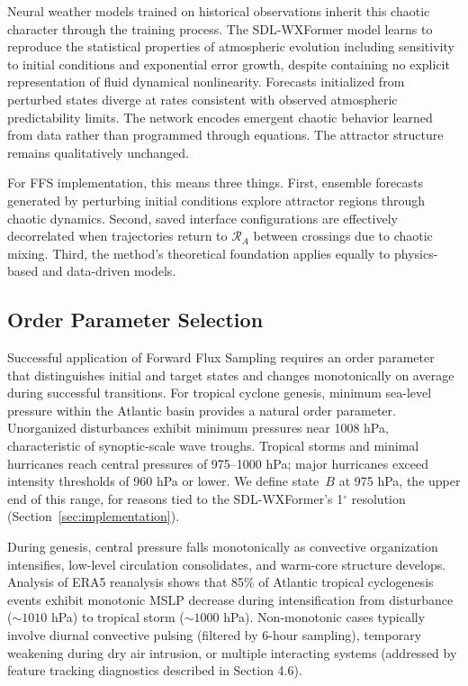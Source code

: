 \documentclass[11pt]{article}
\begin{document}
Neural weather models trained on historical observations inherit this chaotic character through the training process. The SDL-WXFormer model learns to reproduce the statistical properties of atmospheric evolution including sensitivity to initial conditions and exponential error growth, despite containing no explicit representation of fluid dynamical nonlinearity. Forecasts initialized from perturbed states diverge at rates consistent with observed atmospheric predictability limits. The network encodes emergent chaotic behavior learned from data rather than programmed through equations. The attractor structure remains qualitatively unchanged.

For FFS implementation, this means three things. First, ensemble forecasts generated by perturbing initial conditions explore attractor regions through chaotic dynamics. Second, saved interface configurations are effectively decorrelated when trajectories return to $\mathcal{R}_A$ between crossings due to chaotic mixing. Third, the method's theoretical foundation applies equally to physics-based and data-driven models.

\subsection{Order Parameter Selection}

Successful application of Forward Flux Sampling requires an order parameter that distinguishes initial and target states and changes monotonically on average during successful transitions. For tropical cyclone genesis, minimum sea-level pressure within the Atlantic basin provides a natural order parameter. Unorganized disturbances exhibit minimum pressures near 1008 hPa, characteristic of synoptic-scale wave troughs. Tropical storms and minimal hurricanes reach central pressures of 975--1000 hPa; major hurricanes exceed intensity thresholds of 960 hPa or lower. We define state~$B$ at 975 hPa, the upper end of this range, for reasons tied to the SDL-WXFormer's 1$^\circ$ resolution (Section~\ref{sec:implementation}).

During genesis, central pressure falls monotonically as convective organization intensifies, low-level circulation consolidates, and warm-core structure develops. Analysis of ERA5 reanalysis shows that 85\% of Atlantic tropical cyclogenesis events exhibit monotonic MSLP decrease during intensification from disturbance ($\sim 1010$ hPa) to tropical storm ($\sim 1000$ hPa). Non-monotonic cases typically involve diurnal convective pulsing (filtered by 6-hour sampling), temporary weakening during dry air intrusion, or multiple interacting systems (addressed by feature tracking diagnostics described in Section 4.6).
\end{document}

